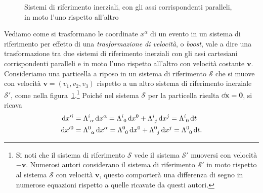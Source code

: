 \begin{figure}
  \centering
  \caption[Sistemi di riferimento inerziali in moto l'uno rispetto
  all'altro]{Sistemi di riferimento inerziali, con gli assi corrispondenti
    paralleli, in moto l'uno rispetto all'altro}
  \label{fig:trasformazioni-lorentz}
\end{figure}
Vediamo come si trasformano le coordinate $x^{\alpha}$ di un evento in un
sistema di riferimento per effetto di una \emph{trasformazione di velocità}, o
\emph{boost}, vale a dire una trasformazione tra due sistemi di
riferimento inerziali con gli assi cartesiani corrispondenti paralleli e in moto
l'uno rispetto all'altro con velocità costante $\bm{v}$.  Consideriamo una
particella a riposo in un sistema di riferimento $\mathcal{S}$ che si muove con
velocità $\bm{v} = (v_{1},v_{2},v_{3})$ rispetto a un altro sistema di
riferimento inerziale $\mathcal{S}'$, come nella
figura~\ref{fig:trasformazioni-lorentz}.\footnote{Si noti che il sistema di
  riferimento $\mathcal{S}$ vede il sistema $\mathcal{S}'$ muoversi con velocità
  $-\bm{v}$.  Numerosi autori considerano il sistema di riferimento
  $\mathcal{S}'$ in moto rispetto al sistema $\mathcal{S}$ con velocità
  $\bm{v}$, questo comporterà una differenza di segno in numerose equazioni
  rispetto a quelle ricavate da questi autori.}
Poiché nel sistema $\mathcal{S}$ per la particella risulta $\dd\bm{x} = \bm{0}$,
si ricava
\begin{subequations}
  \begin{align}
    \dd x'^{i} &= \tensor{\Lambda}{^{i}_{\alpha}}\dd x^{\alpha} =
    \tensor{\Lambda}{^{i}_{0}}\dd x^{0} + \tensor{\Lambda}{^{i}_{j}}\dd x^{j} =
    \tensor{\Lambda}{^{i}_{0}}\dd t \\
    \dd x'^{0} &= \tensor{\Lambda}{^{0}_{\alpha}}\dd x^{\alpha} =
    \tensor{\Lambda}{^{0}_{0}}\dd x^{0} + \tensor{\Lambda}{^{0}_{j}}\dd x^{j} =
    \tensor{\Lambda}{^{0}_{0}}\dd t.
  \end{align}
\end{subequations}
